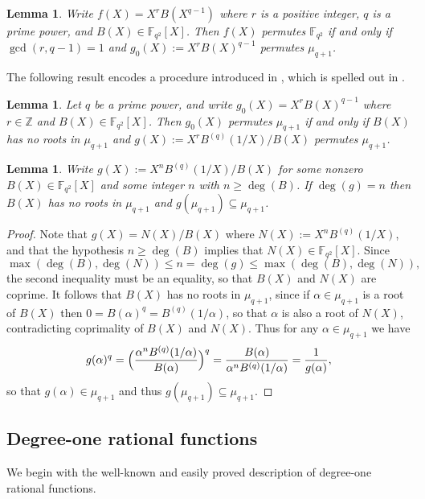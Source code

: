 \documentclass[11pt]{amsart}
\numberwithin{equation}{section}
\newtheorem{lemma}[equation]{Lemma}
\theoremstyle{definition}
\newcommand{\F}{\mathbb{F}}
\newcommand{\Z}{\mathbb{Z}}
\begin{document}
\begin{lemma}\label{old}
Write $f(X)=X^r B(X^{q-1})$ where $r$ is a positive integer, $q$ is a prime power, and $B(X)\in\F_{q^2}[X]$. Then $f(X)$ 
permutes\/ $\F_{q^2}$ if and only if $\gcd(r,q-1)=1$ and $g_0(X):=X^r B(X)^{q-1}$ permutes $\mu_{q+1}$.
\end{lemma}

The following result encodes a procedure introduced in \cite{ZR}, which is spelled out in \cite[Lemma~2.2]{Zx}.

\begin{lemma}\label{lemx}
Let $q$ be a prime power, and write $g_0(X)=X^r B(X)^{q-1}$ where $r\in\Z$ and $B(X)\in\F_{q^2}[X]$. Then $g_0(X)$ permutes 
$\mu_{q+1}$ if and only if $B(X)$ has no roots in $\mu_{q+1}$ and $g(X):=X^r B^{(q)}(1/X)/B(X)$ permutes $\mu_{q+1}$.
\end{lemma}

\begin{lemma}\label{scr}
Write $g(X):=X^n B^{(q)}(1/X)/B(X)$ for some nonzero $B(X)\in\F_{q^2}[X]$ and some integer $n$ with $n\ge\deg(B)$.  If $\deg(g)=n$ then $B(X)$ has no roots in $\mu_{q+1}$ and $g(\mu_{q+1})\subseteq\mu_{q+1}$.
\end{lemma}

\begin{proof}
Note that $g(X)=N(X)/B(X)$ where $N(X):=X^n B^{(q)}(1/X)$, and that the hypothesis $n\ge\deg(B)$ implies that $N(X)\in\F_{q^2}[X]$.
Since 
\[
\max(\deg(B),\deg(N))\le n=\deg(g)\le\max(\deg(B),\deg(N)),
\]
the second inequality must be an equality, so that $B(X)$ and $N(X)$ are coprime.
It follows that $B(X)$ has no roots in $\mu_{q+1}$, since if $\alpha\in\mu_{q+1}$ is a root of $B(X)$ then
$0=B(\alpha)^q=B^{(q)}(1/\alpha)$, so that $\alpha$ is also a root of $N(X)$, contradicting coprimality of $B(X)$ and $N(X)$. Thus for any $\alpha\in\mu_{q+1}$ we have
\[
g(\alpha)^q= \Bigl(\frac{ \alpha^n B^{(q)}(1/\alpha)}{B(\alpha)} \Bigr)^q = \frac{B(\alpha)} {\alpha^n B^{(q)}(1/\alpha)} = \frac1{g(\alpha)},
\]
so that $g(\alpha)\in\mu_{q+1}$ and thus $g(\mu_{q+1})\subseteq\mu_{q+1}$.
\end{proof}


\subsection{Degree-one rational functions}

We begin with the well-known and easily proved description of degree-one rational functions.
\end{document}
